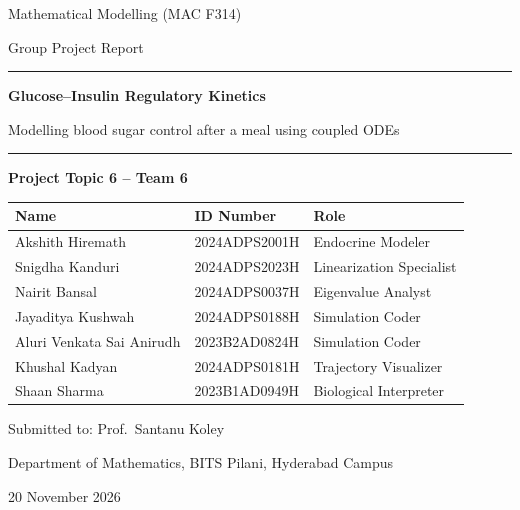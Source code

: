 \documentclass[11pt,a4paper]{article}
\begin{document}
\begin{titlepage}
\centering
\vspace*{1cm}
{\Large Mathematical Modelling (MAC F314)\par}
\vspace{0.4cm}
{\large Group Project Report\par}
\vspace{1.8cm}
\rule{\linewidth}{1pt}\par\vspace{0.4cm}
{\LARGE\bfseries Glucose--Insulin Regulatory Kinetics\par}
\vspace{0.3cm}
{\large Modelling blood sugar control after a meal using coupled ODEs\par}
\vspace{0.3cm}
\rule{\linewidth}{1pt}\par
\vspace{1.5cm}
{\large\bfseries Project Topic 6 \quad -- \quad Team 6\par}
\vspace{1.2cm}
\begin{tabular}{lll}
\toprule
\textbf{Name} & \textbf{ID Number} & \textbf{Role} \\
\midrule
Akshith Hiremath & 2024ADPS2001H & Endocrine Modeler \\
Snigdha Kanduri & 2024ADPS2023H & Linearization Specialist \\
Nairit Bansal & 2024ADPS0037H & Eigenvalue Analyst \\
Jayaditya Kushwah & 2024ADPS0188H & Simulation Coder \\
Aluri Venkata Sai Anirudh & 2023B2AD0824H & Simulation Coder \\
Khushal Kadyan & 2024ADPS0181H & Trajectory Visualizer \\
Shaan Sharma & 2023B1AD0949H & Biological Interpreter \\
\bottomrule
\end{tabular}
\vfill
{\large Submitted to: Prof.\ Santanu Koley\par}
\vspace{0.3cm}
{\large Department of Mathematics, BITS Pilani, Hyderabad Campus\par}
\vspace{0.3cm}
{\large 20 November 2026\par}
\end{titlepage}
\end{document}
